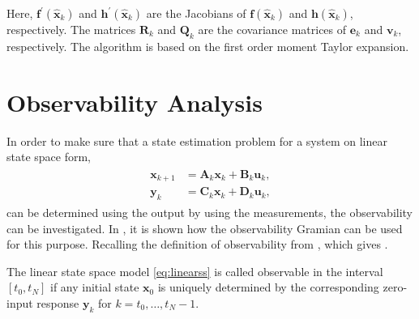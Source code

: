 Here, $\bm{f}^\prime(\hat{\bm{x}}_k)$ and $\bm{h}^\prime(\hat{\bm{x}}_k)$ are the Jacobians of $\bm{f}(\hat{\bm{x}}_k)$ and $\bm{h}(\hat{\bm{x}}_k)$, respectively.
The matrices $\bm{R}_k$ and $\bm{Q}_k$ are the covariance matrices of $\bm{e}_k$ and $\bm{v}_k$, respectively.
The algorithm is based on the first order moment Taylor expansion.

\section{Observability Analysis}
\label{sec:obsanalysis}
In order to make sure that a state estimation problem for a system on linear state space form,
\begin{align}
\label{eq:linearss}
\begin{split}
	\bm{x}_{k+1} &= \bm{A}_k \bm{x}_k + \bm{B}_k \bm{u}_k, \\
	\bm{y}_k &= \bm{C}_k \bm{x}_k + \bm{D}_k \bm{u}_k,
\end{split}
\end{align}
can be determined using the output \ie by using the measurements, the observability can be investigated.
In \cite{Rugh:1996}, it is shown how the observability Gramian can be used for this purpose.
Recalling the definition of observability from \cite{Rugh:1996}, which gives .

\begin{definition}[Observability] \label{def:observability}
	The linear state space model \eqref{eq:linearss} is called observable in the interval $[t_0, t_N]$ if any initial state $\bm{x}_0$ is uniquely determined by the corresponding zero-input response $\bm{y}_k$ for $k=t_0,\dots,t_N-1$.
\end{definition}

